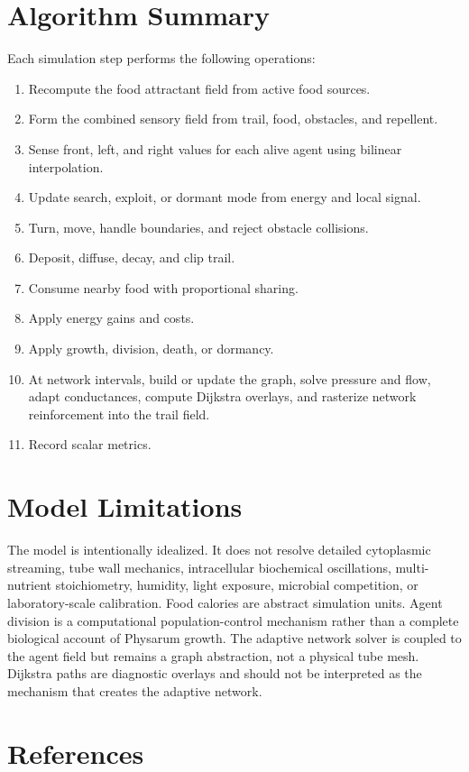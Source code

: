 \documentclass[11pt]{article}
\begin{document}
\section{Algorithm Summary}
Each simulation step performs the following operations:
\begin{enumerate}
  \item Recompute the food attractant field from active food sources.
  \item Form the combined sensory field from trail, food, obstacles, and repellent.
  \item Sense front, left, and right values for each alive agent using bilinear interpolation.
  \item Update search, exploit, or dormant mode from energy and local signal.
  \item Turn, move, handle boundaries, and reject obstacle collisions.
  \item Deposit, diffuse, decay, and clip trail.
  \item Consume nearby food with proportional sharing.
  \item Apply energy gains and costs.
  \item Apply growth, division, death, or dormancy.
  \item At network intervals, build or update the graph, solve pressure and flow, adapt conductances, compute Dijkstra overlays, and rasterize network reinforcement into the trail field.
  \item Record scalar metrics.
\end{enumerate}

\section{Model Limitations}
The model is intentionally idealized. It does not resolve detailed cytoplasmic
streaming, tube wall mechanics, intracellular biochemical oscillations,
multi-nutrient stoichiometry, humidity, light exposure, microbial competition,
or laboratory-scale calibration. Food calories are abstract simulation units.
Agent division is a computational population-control mechanism rather than a
complete biological account of Physarum growth. The adaptive network solver is
coupled to the agent field but remains a graph abstraction, not a physical tube
mesh. Dijkstra paths are diagnostic overlays and should not be interpreted as
the mechanism that creates the adaptive network.

\section{References}


\end{document}
